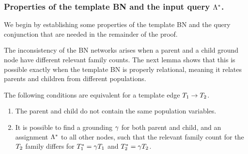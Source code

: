 \documentclass[runningheads,a4paper]{llncs}
\begin{document}
\subsubsection{Properties of the template BN and the input query $\Lambda^{*}\hspace{0.0ex}$.}
We begin by establishing some properties of the template BN and the query conjunction that are needed in the remainder of the proof.
%

The inconsistency of the BN networks arises when a parent and a child ground node have different relevant family counts. The next lemma shows that this is possible exactly when the template BN is properly relational, meaning it relates parents and children from different populations.

\begin{lemma} \label{lemma:grounding} The following conditions are equivalent for a template edge $T_{1} \rightarrow T_{2}$.
\begin{enumerate}
\item The parent and child do not contain the same population variables.
\item It is possible to find a grounding $\gamma$ for both parent and child, and an assignment $\Lambda^{*}\hspace{0.0ex}$ to all other nodes, such that the relevant family count for the $T_{2}$ family differs for $T_{1}^{*}\hspace{0.0ex} = \gamma T_{1}$ 
and $T_{2}^{*}\hspace{0.0ex} = \gamma T_{2}$.
\end{enumerate}
\end{lemma}
\end{document}
